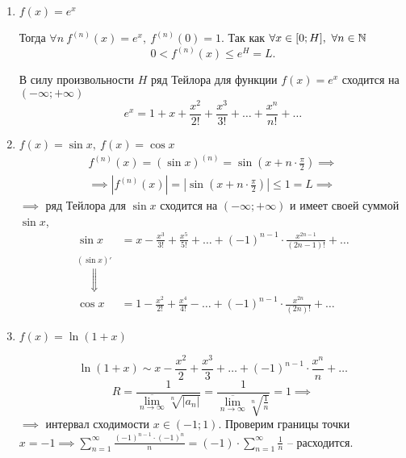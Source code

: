 \begin{note}\leavevmode
    \begin{enumerate}
        \item $f(x) = e^x$

              Тогда $\forall n \ f^{(n)}(x) = e^x, \ f^{(n)}(0) = 1$. Так как $\forall x \in [0;H], \ \forall n \in \mathbb{N}$
              \[
                  0 < f^{(n)}(x) \leqslant e^H = L.
              \]

              В силу произвольности $H$ ряд Тейлора для функции $f(x) = e^x$ сходится на $(-\infty;+\infty)$
              \[
                  e^x = 1 + x + \frac{x^2}{2!} + \frac{x^3}{3!} + \ldots + \frac{x^n}{n!} + \ldots
              \]

        \item $f(x) = \sin x, \ f(x) = \cos x$
              \begin{multline*}
                  f^{(n)}(x) = (\sin x )^{(n)} = \sin \left(x + n \cdot \frac{\pi}{2}\right) \implies \\
                  \implies \left|f^{(n)}(x)\right| = \left|\sin \left(x + n \cdot \frac{\pi}{2}\right)\right| \leqslant 1 = L \implies
              \end{multline*}
              $\implies$ ряд Тейлора для $\sin x$ сходится на $(-\infty;+\infty)$ и имеет своей суммой $\sin x$,
              \[
                  \begin{array}{cl}
                      \sin x                          & = x - \frac{x^3}{3!} + \frac{x^5}{5!} + \ldots + (-1)^{n-1}\cdot \frac{x^{2n - 1}}{(2n-1)!} + \ldots \\
                      \overset{(\sin x)'}{\Downarrow} &                                                                                                      \\
                      \cos x                          & = 1 - \frac{x^2}{2!} + \frac{x^4}{4!} - \ldots + (-1)^{n-1}\cdot \frac{x^{2n}}{(2n)!} + \ldots
                  \end{array}
              \]

        \item $f(x) = \ln(1 + x)$

              \[
                  \ln(1+x) \sim x - \frac{x^2}{2} + \frac{x^3}{3} + \ldots + (-1)^{n-1} \cdot \frac{x^n}{n} + \ldots
              \]
              \[
                  R = \frac{1}{\underset{n\rightarrow \infty}{\overline{\lim}}\sqrt[n]{|a_n|}} = \frac{1}{\underset{n\rightarrow \infty}{\overline{\lim}}\sqrt[n]{\frac{1}{n}}} = 1 \implies
              \]
              $\implies$ интервал сходимости $x \in (-1;1)$. Проверим границы точки $x = -1 \implies \sum_{n=1}^{\infty}\frac{(-1)^{n-1}\cdot (-1)^n}{n} = (-1)\cdot \sum_{n=1}^{\infty}\frac{1}{n}$ -- расходится.


\end{enumerate}
\end{note}
